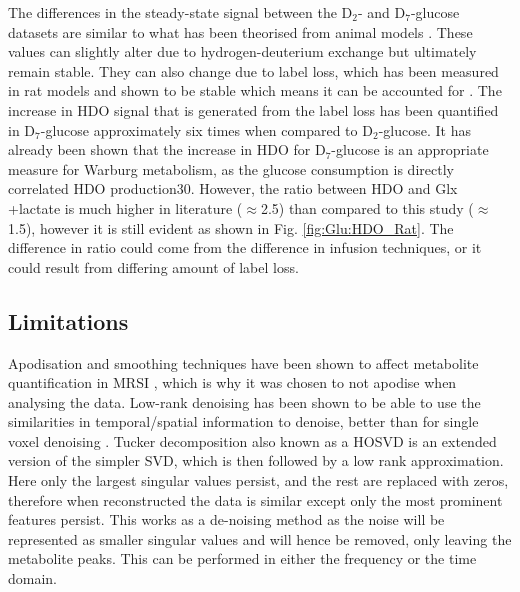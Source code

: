 The differences in the steady-state signal between the D$_2$- and D$_7$-glucose datasets are similar to what has been theorised from animal models \cite{Mahar2021DeuteratedGlucose}. These values can slightly alter due to hydrogen-deuterium exchange but ultimately remain stable. They can also change due to label loss, which has been measured in rat models and shown to be stable which means it can be accounted for \cite{DeGraaf2021CharacterizationStudies}. The increase in \ac{HDO} signal that is generated from the label loss has been quantified in D$_7$-glucose approximately six times when compared to D$_2$-glucose. It has already been shown that the increase in \ac{HDO} for D$_7$-glucose is an appropriate measure for Warburg metabolism, as the glucose consumption is directly correlated HDO production30. However, the ratio between \ac{HDO} and Glx +lactate is much higher in literature ($\approx$2.5) than compared to this study ($\approx$1.5), however it is still evident as shown in Fig. \ref{fig:Glu:HDO_Rat}. The difference in ratio could come from the difference in infusion techniques, or it could result from differing amount of label loss.

\subsection{Limitations}

Apodisation and smoothing techniques have been shown to affect metabolite quantification in \ac{MRSI} \cite{Goryawala2020EffectsFitting}, which is why it was chosen to not apodise when analysing the data. Low-rank denoising has been shown to be able to use the similarities in temporal/spatial information to denoise, better than for single voxel denoising \cite{Brender2019DynamicHyperpolarization, Goryawala2020EffectsFitting}. Tucker decomposition also known as a \ac{HOSVD} is an extended version of the simpler \ac{SVD}, which is then followed by a low rank approximation. Here only the largest singular values persist, and the rest are replaced with zeros, therefore when reconstructed the data is similar except only the most prominent features persist. This works as a de-noising method as the noise will be represented as smaller singular values and will hence be removed, only leaving the metabolite peaks. This can be performed in either the frequency or the time domain. 

